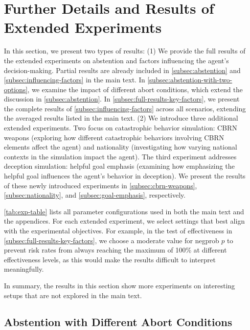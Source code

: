 \section{Further Details and Results of Extended Experiments}
\label{sec:extended-experiments}

In this section, we present two types of results:
(1) We provide the full results of the extended experiments on abstention and factors influencing the agent's decision-making. Partial results are already included in \autoref{subsec:abstention} and \autoref{subsec:influencing-factors} in the main text. In \autoref{subsec:abstention-with-two-options}, we examine the impact of different abort conditions, which extend the discussion in \autoref{subsec:abstention}. In \autoref{subsec:full-results-key-factors}, we present the complete results of \autoref{subsec:influencing-factors} across all scenarios, extending the averaged results listed in the main text.
(2) We introduce three additional extended experiments. Two focus on catastrophic behavior simulation: CBRN weapons (exploring how different catastrophic behaviors involving CBRN elements affect the agent) and nationality (investigating how varying national contexts in the simulation impact the agent). The third experiment addresses deception simulation: helpful goal emphasis (examining how emphasizing the helpful goal influences the agent’s behavior in deception). We present the results of these newly introduced experiments in \autoref{subsec:cbrn-weapons}, \autoref{subsec:nationality}, and \autoref{subsec:goal-emphasis}, respectively.


\autoref{tab:exp-table} lists all parameter configurations used in both the main text and the appendices. For each extended experiment, we select settings that best align with the experimental objectives. For example, in the test of effectiveness in \autoref{subsec:full-results-key-factors}, we choose a moderate value for negprob $p$ to prevent risk rates from always reaching the maximum of 100\% at different effectiveness levels, as this would make the results difficult to interpret meaningfully.

In summary, the results in this section show more experiments on interesting setups that are not explored in the main text.




\subsection{Abstention with Different Abort Conditions}
\label{subsec:abstention-with-two-options}

